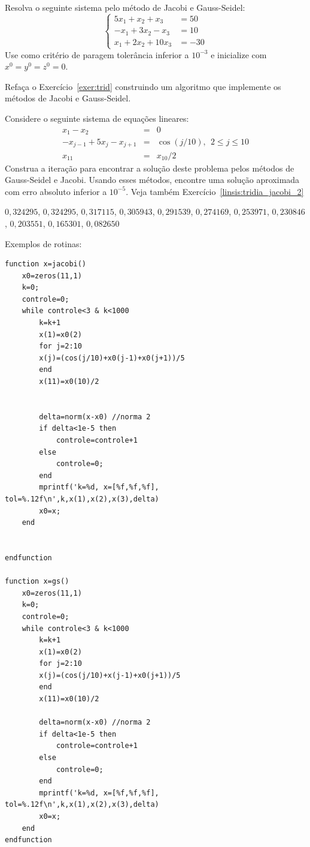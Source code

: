 \begin{exer}
Resolva o seguinte sistema pelo método de Jacobi e Gauss-Seidel:
$$\left\{\begin{array}{ll}
5x_1+x_2+x_3&=50\\
-x_1+3x_2-x_3&=10\\
x_1+2x_2+10x_3&=-30
\end{array}\right.$$
Use como critério de paragem tolerância inferior a $10^{-3}$ e inicialize com $x^{0}=y^{0}=z^{0}=0$.
\end{exer}

\begin{exer}Refaça o Exercício~\ref{exer:trid} construindo um algoritmo que implemente os métodos de Jacobi e Gauss-Seidel.
\end{exer}

\begin{exer}\label{linsis:tridia_jacobi_1} Considere o seguinte sistema de equações lineares:
\begin{eqnarray}
x_1-x_2&=&0\nonumber\\
-x_{j-1}+5x_j-x_{j+1}&=&\cos(j/10),~~ 2\leq j \leq 10\nonumber\\
x_{11}&=&x_{10}/2
\end{eqnarray}
Construa a iteração para encontrar a solução deste problema pelos métodos de Gauss-Seidel e Jacobi. Usando esses métodos, encontre uma solução aproximada com erro absoluto inferior a $10^{-5}$. Veja também Exercício~\ref{linsis:tridia_jacobi_2}
\end{exer}
\begin{resp}

$0,324295$, $0,324295$, $0,317115$, $0,305943$, $0,291539$, $0,274169$, $0,253971$, $0,230846$, $0,203551$, $0,165301$, $0,082650$

\ifisscilab
Exemplos de rotinas:
\begin{verbatim}
function x=jacobi()
    x0=zeros(11,1)
    k=0;
    controle=0;
    while controle<3 & k<1000
        k=k+1
        x(1)=x0(2)
        for j=2:10
        x(j)=(cos(j/10)+x0(j-1)+x0(j+1))/5
        end
        x(11)=x0(10)/2


        delta=norm(x-x0) //norma 2
        if delta<1e-5 then
            controle=controle+1
        else
            controle=0;
        end
        mprintf('k=%d, x=[%f,%f,%f], tol=%.12f\n',k,x(1),x(2),x(3),delta)
        x0=x;
    end


endfunction

function x=gs()
    x0=zeros(11,1)
    k=0;
    controle=0;
    while controle<3 & k<1000
        k=k+1
        x(1)=x0(2)
        for j=2:10
        x(j)=(cos(j/10)+x(j-1)+x0(j+1))/5
        end
        x(11)=x0(10)/2

        delta=norm(x-x0) //norma 2
        if delta<1e-5 then
            controle=controle+1
        else
            controle=0;
        end
        mprintf('k=%d, x=[%f,%f,%f], tol=%.12f\n',k,x(1),x(2),x(3),delta)
        x0=x;
    end
endfunction
\end{verbatim}
\fi

\end{resp}

